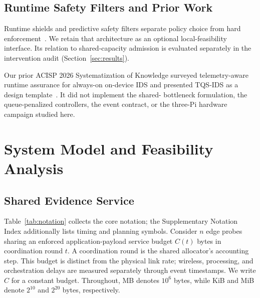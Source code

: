 \documentclass[10pt,journal]{IEEEtran}
\begin{document}
\subsection{Runtime Safety Filters and Prior Work}
Runtime shields and predictive safety filters separate policy choice from
hard enforcement~\cite{alshiekh2018shielding,wabersich2021filter}. We retain
that architecture as an optional local-feasibility interface. Its relation
to shared-capacity admission is evaluated separately in the intervention
audit (Section~\ref{sec:results}).

Our prior ACISP 2026 Systematization of Knowledge surveyed telemetry-aware
runtime assurance for always-on on-device IDS and presented TQS-IDS as a
design template~\cite{ouyang2026sok}. It did not implement the shared-
bottleneck formulation, the queue-penalized controllers, the event contract,
or the three-Pi hardware campaign studied here.

\section{System Model and Feasibility Analysis}
\label{sec:model}

\subsection{Shared Evidence Service}
Table~\ref{tab:notation} collects the core notation; the Supplementary
Notation Index additionally lists timing and planning symbols. Consider
$n$ edge probes sharing an enforced application-payload service budget
$C(t)$ bytes in coordination round $t$. A coordination round is the shared
allocator's accounting step. This budget is distinct from the physical
link rate; wireless, processing, and orchestration delays are measured
separately through event timestamps. We write $C$ for a constant budget.
Throughout, MB denotes $10^6$ bytes, while KiB and MiB denote $2^{10}$ and
$2^{20}$ bytes, respectively.
\end{document}
